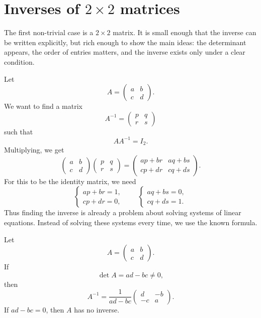 \section{Inverses of \(2\times2\) matrices}

The first non-trivial case is a \(2\times2\) matrix. It is small enough that the inverse can be written explicitly, but rich enough to show the main ideas: the determinant appears, the order of entries matters, and the inverse exists only under a clear condition.

Let
\[
A=\begin{pmatrix}a&b\\c&d\end{pmatrix}.
\]
We want to find a matrix
\[
A^{-1}=\begin{pmatrix}p&q\\r&s\end{pmatrix}
\]
such that
\[
AA^{-1}=I_2.
\]
Multiplying, we get
\[
\begin{pmatrix}a&b\\c&d\end{pmatrix}
\begin{pmatrix}p&q\\r&s\end{pmatrix}
=
\begin{pmatrix}
ap+br&aq+bs\\
cp+dr&cq+ds
\end{pmatrix}.
\]
For this to be the identity matrix, we need
\[
\begin{cases}
ap+br=1,\\
cp+dr=0,
\end{cases}
\qquad
\begin{cases}
aq+bs=0,\\
cq+ds=1.
\end{cases}
\]
Thus finding the inverse is already a problem about solving systems of linear equations. Instead of solving these systems every time, we use the known formula.

\begin{theorembox}
Let
\[
A=\begin{pmatrix}a&b\\c&d\end{pmatrix}.
\]
If
\[
\det A=ad-bc\ne0,
\]
then
\[
A^{-1}=\frac{1}{ad-bc}
\begin{pmatrix}
d&-b\\
-c&a
\end{pmatrix}.
\]
If \(ad-bc=0\), then \(A\) has no inverse.
\end{theorembox}


